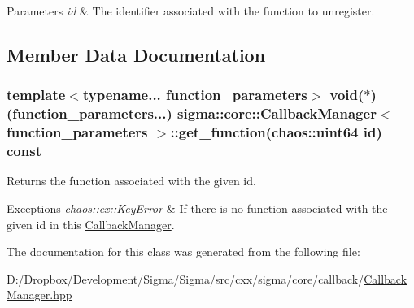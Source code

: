 \begin{DoxyParams}{Parameters}
{\em id} & The identifier associated with the function to unregister. \\
\hline
\end{DoxyParams}


\subsection{Member Data Documentation}
\hypertarget{classsigma_1_1core_1_1_callback_manager_a3c36f3c32e2d6ea0f395f6bdd8775039}{}
\subsubsection[{get\+\_\+function}]{\setlength{\rightskip}{0pt plus 5cm}template$<$typename... function\+\_\+parameters$>$ void($\ast$)(function\+\_\+parameters...) {\bf sigma\+::core\+::\+Callback\+Manager}$<$ function\+\_\+parameters $>$\+::get\+\_\+function(chaos\+::uint64 id) const\hspace{0.3cm}{\ttfamily [inline]}}\label{classsigma_1_1core_1_1_callback_manager_a3c36f3c32e2d6ea0f395f6bdd8775039}


Returns the function associated with the given id. 


\begin{DoxyExceptions}{Exceptions}
{\em chaos\+::ex\+::\+Key\+Error} & If there is no function associated with the given id in this \hyperlink{classsigma_1_1core_1_1_callback_manager}{Callback\+Manager}. \\
\hline
\end{DoxyExceptions}


The documentation for this class was generated from the following file\+:\begin{DoxyCompactItemize}
\item 
D\+:/\+Dropbox/\+Development/\+Sigma/\+Sigma/src/cxx/sigma/core/callback/\hyperlink{_callback_manager_8hpp}{Callback\+Manager.\+hpp}\end{DoxyCompactItemize}
